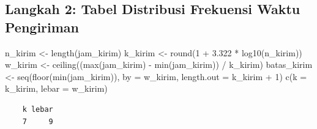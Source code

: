\documentclass[
  indonesian,
  letterpaper,
]{book}
\newenvironment{Shaded}{\begin{snugshade}}{\end{snugshade}}
\newcommand{\AttributeTok}[1]{\textcolor[rgb]{0.40,0.45,0.13}{#1}}
\newcommand{\DecValTok}[1]{\textcolor[rgb]{0.68,0.00,0.00}{#1}}
\newcommand{\FloatTok}[1]{\textcolor[rgb]{0.68,0.00,0.00}{#1}}
\newcommand{\FunctionTok}[1]{\textcolor[rgb]{0.28,0.35,0.67}{#1}}
\newcommand{\NormalTok}[1]{\textcolor[rgb]{0.00,0.23,0.31}{#1}}
\newcommand{\OtherTok}[1]{\textcolor[rgb]{0.00,0.23,0.31}{#1}}
\newcommand{\SpecialCharTok}[1]{\textcolor[rgb]{0.37,0.37,0.37}{#1}}
\begin{document}
\subsection{Langkah 2: Tabel Distribusi Frekuensi Waktu
Pengiriman}\label{langkah-2-tabel-distribusi-frekuensi-waktu-pengiriman}

\begin{Shaded}
\begin{Highlighting}[]
\NormalTok{n\_kirim }\OtherTok{\textless{}{-}} \FunctionTok{length}\NormalTok{(jam\_kirim)}
\NormalTok{k\_kirim }\OtherTok{\textless{}{-}} \FunctionTok{round}\NormalTok{(}\DecValTok{1} \SpecialCharTok{+} \FloatTok{3.322} \SpecialCharTok{*} \FunctionTok{log10}\NormalTok{(n\_kirim))}
\NormalTok{w\_kirim }\OtherTok{\textless{}{-}} \FunctionTok{ceiling}\NormalTok{((}\FunctionTok{max}\NormalTok{(jam\_kirim) }\SpecialCharTok{{-}} \FunctionTok{min}\NormalTok{(jam\_kirim)) }\SpecialCharTok{/}\NormalTok{ k\_kirim)}
\NormalTok{batas\_kirim }\OtherTok{\textless{}{-}} \FunctionTok{seq}\NormalTok{(}\FunctionTok{floor}\NormalTok{(}\FunctionTok{min}\NormalTok{(jam\_kirim)), }\AttributeTok{by =}\NormalTok{ w\_kirim, }\AttributeTok{length.out =}\NormalTok{ k\_kirim }\SpecialCharTok{+} \DecValTok{1}\NormalTok{)}
\FunctionTok{c}\NormalTok{(}\AttributeTok{k =}\NormalTok{ k\_kirim, }\AttributeTok{lebar =}\NormalTok{ w\_kirim)}
\end{Highlighting}
\end{Shaded}

\begin{verbatim}
    k lebar 
    7     9 
\end{verbatim}
\end{document}
